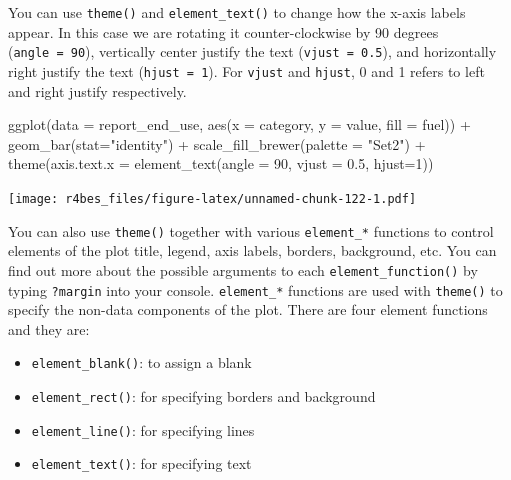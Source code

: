 \documentclass[
]{book}
\newenvironment{Shaded}{\begin{snugshade}}{\end{snugshade}}
\newcommand{\AttributeTok}[1]{\textcolor[rgb]{0.77,0.63,0.00}{#1}}
\newcommand{\DecValTok}[1]{\textcolor[rgb]{0.00,0.00,0.81}{#1}}
\newcommand{\FloatTok}[1]{\textcolor[rgb]{0.00,0.00,0.81}{#1}}
\newcommand{\FunctionTok}[1]{\textcolor[rgb]{0.00,0.00,0.00}{#1}}
\newcommand{\NormalTok}[1]{#1}
\newcommand{\SpecialCharTok}[1]{\textcolor[rgb]{0.00,0.00,0.00}{#1}}
\newcommand{\StringTok}[1]{\textcolor[rgb]{0.31,0.60,0.02}{#1}}
\providecommand{\tightlist}{%
  \setlength{\itemsep}{0pt}\setlength{\parskip}{0pt}}
\begin{document}
You can use \texttt{theme()} and \texttt{element\_text()} to change how the x-axis labels appear. In this case we are rotating it counter-clockwise by 90 degrees (\texttt{angle\ =\ 90}), vertically center justify the text (\texttt{vjust\ =\ 0.5}), and horizontally right justify the text (\texttt{hjust\ =\ 1}). For \texttt{vjust} and \texttt{hjust}, 0 and 1 refers to left and right justify respectively.

\begin{Shaded}
\begin{Highlighting}[]
\FunctionTok{ggplot}\NormalTok{(}\AttributeTok{data =}\NormalTok{ report\_end\_use, }\FunctionTok{aes}\NormalTok{(}\AttributeTok{x =}\NormalTok{ category, }\AttributeTok{y =}\NormalTok{ value, }\AttributeTok{fill =}\NormalTok{ fuel)) }\SpecialCharTok{+}
    \FunctionTok{geom\_bar}\NormalTok{(}\AttributeTok{stat=}\StringTok{"identity"}\NormalTok{) }\SpecialCharTok{+} 
    \FunctionTok{scale\_fill\_brewer}\NormalTok{(}\AttributeTok{palette =} \StringTok{"Set2"}\NormalTok{) }\SpecialCharTok{+}
    \FunctionTok{theme}\NormalTok{(}\AttributeTok{axis.text.x =} \FunctionTok{element\_text}\NormalTok{(}\AttributeTok{angle =} \DecValTok{90}\NormalTok{, }\AttributeTok{vjust =} \FloatTok{0.5}\NormalTok{, }\AttributeTok{hjust=}\DecValTok{1}\NormalTok{))}
\end{Highlighting}
\end{Shaded}

\texttt{[image: r4bes\_files/figure-latex/unnamed-chunk-122-1.pdf]}

You can also use \texttt{theme()} together with various \texttt{element\_*} functions to control elements of the plot title, legend, axis labels, borders, background, etc. You can find out more about the possible arguments to each \texttt{element\_function()} by typing \texttt{?margin} into your console. \texttt{element\_*} functions are used with \texttt{theme()} to specify the non-data components of the plot. There are four element functions and they are:

\begin{itemize}
\tightlist
\item
  \texttt{element\_blank()}: to assign a blank
\item
  \texttt{element\_rect()}: for specifying borders and background
\item
  \texttt{element\_line()}: for specifying lines
\item
  \texttt{element\_text()}: for specifying text
\end{itemize}
\end{document}

